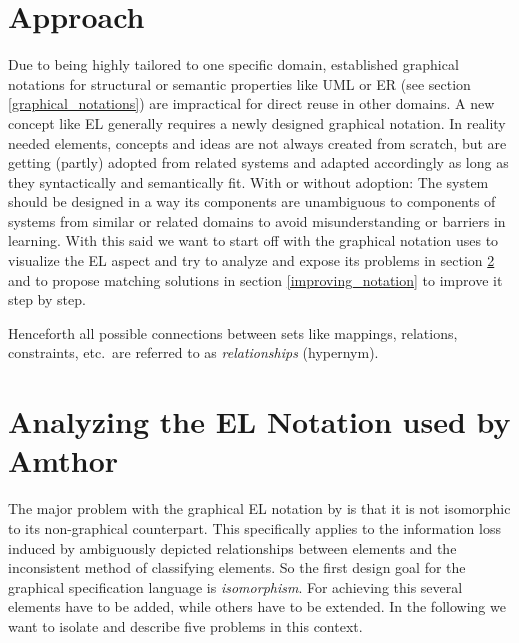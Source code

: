 \documentclass[twoside, openright, 12pt]{book}
\begin{document}
\section{Approach}
\label{gsl_concept}

Due to being highly tailored to one specific domain, established graphical notations for structural or semantic properties like UML or ER (see section \ref{graphical_notations}) are impractical for direct reuse in other domains.
A new concept like EL generally requires a newly designed graphical notation.
In reality needed elements, concepts and ideas are not always created from scratch, but are getting (partly) adopted from related systems and adapted accordingly as long as they syntactically and semantically fit.
With or without adoption: The system should be designed in a way its components are unambiguous to components of systems from similar or related domains to avoid misunderstanding or barriers in learning.
With this said we want to start off with the graphical notation \cite{Amthor18} uses to visualize the EL aspect and try to analyze and expose its problems in section \ref{analyzing_notation} and to propose matching solutions in section \ref{improving_notation} to improve it step by step.

\begin{mdframed}[style=mystyle,frametitle=Note]
Henceforth all possible connections between sets like mappings, relations, constraints, etc.~are referred to as \textit{relationships} (hypernym).
\end{mdframed}



\section{Analyzing the EL Notation used by Amthor}
\label{analyzing_notation}
The major problem with the graphical EL notation by \cite{Amthor18} is that it is not isomorphic to its non-graphical counterpart.
This specifically applies to the information loss induced by ambiguously depicted relationships between elements and the inconsistent method of classifying elements.
So the first design goal for the graphical specification language is \textit{isomorphism}.
For achieving this several elements have to be added, while others have to be extended.
In the following we want to isolate and describe five problems in this context.
\end{document}
